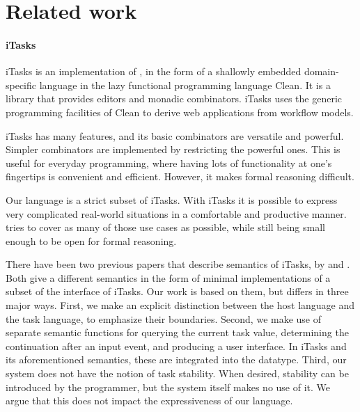 


\section{Related work}
\label{sec:relatedwork}



\paragraph{iTasks}

iTasks is an implementation of \TOP, in the form of a shallowly embedded domain-specific language in the lazy functional programming language Clean.
It is a library that provides editors and monadic combinators.
iTasks uses the generic programming facilities of Clean to derive web applications from workflow models.

iTasks has many features, and its basic combinators are versatile and powerful.
Simpler combinators are implemented by restricting the powerful ones.
This is useful for everyday programming, where having lots of functionality at one's fingertips is convenient and efficient.
However, it makes formal reasoning difficult.

Our language is a strict subset of iTasks.
With iTasks it is possible to express very complicated real-world situations in a comfortable and productive manner.
\TOPHAT tries to cover as many of those use cases as possible, while still being small enough to be open for formal reasoning.

There have been two previous papers that describe semantics of iTasks, by \citet{conf/ifl/KoopmanPA08} and \citet{conf/ppdp/PlasmeijerLMAK12}.
Both give a different semantics in the form of minimal implementations of a subset of the interface of iTasks.
Our work is based on them, but differs in three major ways.
First, we make an explicit distinction between the host language and the task language, to emphasize their boundaries.
Second, we make use of separate semantic functions for querying the current task value, determining the continuation after an input event, and producing a user interface.
In iTasks and its aforementioned semantics, these are integrated into the  datatype.
Third, our system does not have the notion of task stability.
When desired, stability can be introduced by the programmer, but the system itself makes no use of it.
We argue that this does not impact the expressiveness of our language.

